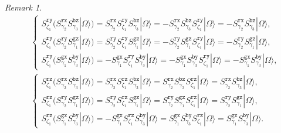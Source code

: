 \documentclass[a4paper,11pt]{article}
\theoremstyle{definition}
\theoremstyle{remark}
\newtheorem{remark}{Remark}[section]
\theoremstyle{remark}
\begin{document}
\begin{remark}
\begin{align*}
    &
    \begin{cases}
        S_{\zeta_1}^{\mathtt{ry}} (S_{\gamma_2}^{\mathtt{rx}}S_{\gamma_3}^{\mathtt{bz}}|\Omega\rangle)  =  S_{\gamma_2}^{\mathtt{rx}} S_{\zeta_1}^{\mathtt{ry}} S_{\gamma_3}^{\mathtt{bz}}|\Omega\rangle = -S_{\gamma_2}^{\mathtt{rx}}S_{\gamma_3}^{\mathtt{bz}} S_{\zeta_1}^{\mathtt{ry}} |\Omega\rangle = -S_{\gamma_2}^{\mathtt{rx}}S_{\gamma_3}^{\mathtt{bz}} |\Omega\rangle, \\
        S_{\zeta_1}^{\mathtt{ry}} (S_{\gamma_2}^{\mathtt{ry}}S_{\gamma_1}^{\mathtt{gz}}|\Omega\rangle)  =  S_{\gamma_2}^{\mathtt{ry}}S_{\zeta_1}^{\mathtt{ry}}S_{\gamma_1}^{\mathtt{gz}}|\Omega\rangle = -S_{\gamma_2}^{\mathtt{ry}}S_{\gamma_1}^{\mathtt{gz}}S_{\zeta_1}^{\mathtt{ry}}|\Omega\rangle = -S_{\gamma_2}^{\mathtt{ry}}S_{\gamma_1}^{\mathtt{gz}}|\Omega\rangle, \\
        S_{\zeta_1}^{\mathtt{ry}} (S_{\gamma_1}^{\mathtt{gx}}S_{\gamma_3}^{\mathtt{by}}|\Omega\rangle)  =  - S_{\gamma_1}^{\mathtt{gx}}S_{\zeta_1}^{\mathtt{ry}}S_{\gamma_3}^{\mathtt{by}}|\Omega\rangle = -S_{\gamma_1}^{\mathtt{gx}}S_{\gamma_3}^{\mathtt{by}}S_{\zeta_1}^{\mathtt{ry}}|\Omega\rangle= -S_{\gamma_1}^{\mathtt{gx}}S_{\gamma_3}^{\mathtt{by}}|\Omega\rangle, 
    \end{cases} \\
    &
    \begin{cases}
        S_{\zeta_1}^{\mathtt{rz}} (S_{\gamma_2}^{\mathtt{rx}}S_{\gamma_3}^{\mathtt{bz}}|\Omega\rangle)  =  S_{\gamma_2}^{\mathtt{rx}} S_{\zeta_1}^{\mathtt{rz}} S_{\gamma_3}^{\mathtt{bz}}|\Omega\rangle = S_{\gamma_2}^{\mathtt{rx}}S_{\gamma_3}^{\mathtt{bz}} S_{\zeta_1}^{\mathtt{rz}} |\Omega\rangle = S_{\gamma_2}^{\mathtt{rx}}S_{\gamma_3}^{\mathtt{bz}} |\Omega\rangle, \\
        S_{\zeta_1}^{\mathtt{rz}} (S_{\gamma_2}^{\mathtt{ry}}S_{\gamma_1}^{\mathtt{gz}}|\Omega\rangle)  =  S_{\gamma_2}^{\mathtt{ry}}S_{\zeta_1}^{\mathtt{rz}}S_{\gamma_1}^{\mathtt{gz}}|\Omega\rangle = S_{\gamma_2}^{\mathtt{ry}}S_{\gamma_1}^{\mathtt{gz}}S_{\zeta_1}^{\mathtt{rz}}|\Omega\rangle = S_{\gamma_2}^{\mathtt{ry}}S_{\gamma_1}^{\mathtt{gz}}|\Omega\rangle, \\
        S_{\zeta_1}^{\mathtt{rz}} (S_{\gamma_1}^{\mathtt{gx}}S_{\gamma_3}^{\mathtt{by}}|\Omega\rangle)  =   -S_{\gamma_1}^{\mathtt{gx}}S_{\zeta_1}^{\mathtt{rz}}S_{\gamma_3}^{\mathtt{by}}|\Omega\rangle = S_{\gamma_1}^{\mathtt{gx}}S_{\gamma_3}^{\mathtt{by}}S_{\zeta_1}^{\mathtt{rz}}|\Omega\rangle= S_{\gamma_1}^{\mathtt{gx}}S_{\gamma_3}^{\mathtt{by}}|\Omega\rangle. 
    \end{cases}

\end{align*}
\end{remark}
\end{document}
